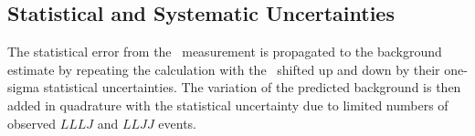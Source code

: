 

\subsection{Statistical and Systematic Uncertainties}

The statistical error from the \ffactor\ measurement is propagated to the
background estimate by repeating the calculation with the \ffactor\ shifted up and down
by their one-sigma statistical uncertainties. The variation of the predicted
background is then added in quadrature with the statistical uncertainty due to
limited numbers of observed $LLLJ$ and $LLJJ$ events. 

